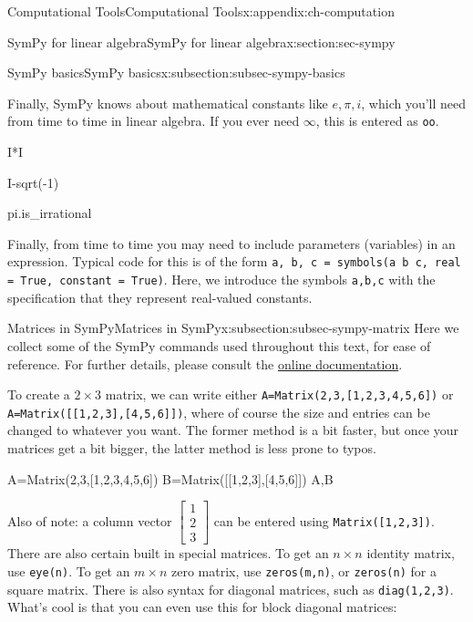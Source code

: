 \documentclass[oneside,10pt,]{book}
\newcommand{\mono}[1]{\texttt{#1}}
\numberwithin{equation}{section}
\newcommand{\bbm}{\begin{bmatrix}}
\newcommand{\ebm}{\end{bmatrix}}
\begin{document}
\begin{appendixptx}{Computational Tools}{}{Computational Tools}{}{}{x:appendix:ch-computation}
\begin{sectionptx}{SymPy for linear algebra}{}{SymPy for linear algebra}{}{}{x:section:sec-sympy}
\begin{subsectionptx}{SymPy basics}{}{SymPy basics}{}{}{x:subsection:subsec-sympy-basics}
\begin{sageinput}
\end{sageinput}
Finally, SymPy knows about mathematical constants like \(e, \pi, i\), which you'll need from time to time in linear algebra. If you ever need \(\infty\), this is entered as \mono{oo}.%
\begin{sageinput}
I*I
\end{sageinput}
\begin{sageinput}
I-sqrt(-1)
\end{sageinput}
\begin{sageinput}
pi.is_irrational
\end{sageinput}
Finally, from time to time you may need to include parameters (variables) in an expression. Typical code for this is of the form \mono{a, b, c = symbols(\textquotesingle{}a b c\textquotesingle{}, real = True, constant = True)}. Here, we introduce the symbols \mono{a,b,c} with the specification that they represent real-valued constants.%
\end{subsectionptx}
%
%
\typeout{************************************************}
\typeout{************************************************}
%
\begin{subsectionptx}{Matrices in SymPy}{}{Matrices in SymPy}{}{}{x:subsection:subsec-sympy-matrix}
Here we collect some of the SymPy commands used throughout this text, for ease of reference. For further details, please consult the \href{https://docs.sympy.org/latest/modules/matrices/matrices.html}{online documentation}.%
\par
To create a \(2\times 3\) matrix, we can write either \mono{A=Matrix(2,3,[1,2,3,4,5,6])} or \mono{A=Matrix([[1,2,3],[4,5,6]])}, where of course the size and entries can be changed to whatever you want. The former method is a bit faster, but once your matrices get a bit bigger, the latter method is less prone to typos.%
\begin{sageinput}
A=Matrix(2,3,[1,2,3,4,5,6])
B=Matrix([[1,2,3],[4,5,6]])
A,B
\end{sageinput}
Also of note: a column vector \(\bbm 1\\2\\3\ebm\) can be entered using \mono{Matrix([1,2,3])}. There are also certain built in special matrices. To get an \(n\times n\) identity matrix, use \mono{eye(n)}. To get an \(m\times n\) zero matrix, use \mono{zeros(m,n)}, or \mono{zeros(n)} for a square matrix. There is also syntax for diagonal matrices, such as \mono{diag(1,2,3)}. What's cool is that you can even use this for block diagonal matrices:%

\end{subsectionptx}
\end{sectionptx}
\end{appendixptx}
\end{document}
